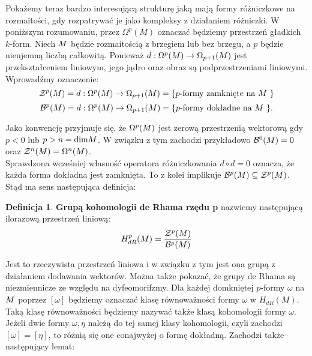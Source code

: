 \documentclass[licencjacka]{pracamgr}
\theoremstyle{definition}
\newtheorem{definition}{Definicja}[section]
\theoremstyle{definition}
\theoremstyle{plain}
\theoremstyle{plain}
\theoremstyle{plain}
\def\M{\ensuremath M}
\begin{document}
Pokażemy teraz bardzo interesującą strukturę jaką mają formy różniczkowe
na rozmaitości, gdy rozpatrywać je jako kompleksy z działaniem różniczki.
W poniższym rozumowaniu, przez $\Omega^p (M)$ oznaczać będziemy
przestrzeń gładkich $k$-form.  Niech $\M$ będzie rozmaitością z
brzegiem lub bez brzegu, a $p$ będzie nieujemną liczbą całkowitą.
Ponieważ $d: \Omega^p (\M ) \rightarrow \Omega_{p+1}(\M) $ jest
przekształceniem liniowym, jego jądro oraz obraz są podprzestrzeniami
liniowymi. Wprowadźmy oznaczenie:
\[
\mathcal{Z}^p ( \M ) =
d: \Omega^{p} (\M ) \rightarrow \Omega_{p+1}(\M) =
\{\text{$p$-formy zamknięte na $\M$ } \}
\]
\[
\mathcal{B}^p ( \M ) =
d: \Omega^{p} (\M ) \rightarrow \Omega_{p+1}(\M) =
\{\text{$p$-formy dokładne na $\M$ } \}.
\]

Jako konwencję przyjmuje się, że $\Omega^{p} ( \M ) $ jest zerową
przestrzenią wektorową gdy $p < 0$ lub $p > n = \text{dim} \M $. W
związku z tym zachodzi przykładowo $\mathcal{B}^0(\M)=0$ oraz
$\mathcal{Z}^n(\M)= \Omega^n(\M)$. \\

Sprawdzona wcześniej własność operatora różniczkowania $d \circ d = 0$ oznacza,
że każda forma dokładna jest zamknięta. To z kolei implikuje 
$ \mathcal{B}^p ( \M) \subseteq \mathcal{Z}^p ( \M) $.
Stąd ma sens następująca definicja:

\begin{definition}
  \textbf{Grupą kohomologii de Rhama rzędu p} nazwiemy następującą
  ilorazową przestrzeń liniową:
  \[
  H^{p}_{dR} ( \M ) = \frac {\mathcal{Z}^p ( \M )} {\mathcal{B}^p ( \M )}
  \]
\end{definition}
Jest to rzeczywista przestrzeń liniowa i w związku z tym jest ona
grupą z działaniem dodawania wektorów. Można także pokazać, że grupy de Rhama są
niezmiennicze ze względu na dyfeomorifzmy. Dla każdej domkniętej $p$-formy
$\omega$ na $\M$ poprzez $[\omega]$ będziemy oznaczać klasę równoważności
formy $\omega$ w $H_{dR} (M)$. Taką klasę równoważności będziemy nazywać także klasą
kohomologii formy $\omega$. Jeżeli dwie formy $\omega, \eta$ należą do tej samej klasy
kohomologii, czyli zachodzi $[\omega] = [\eta]$, to różnią się one conajwyżej o formę
dokładną. Zachodzi także następujący lemat:
\end{document}
